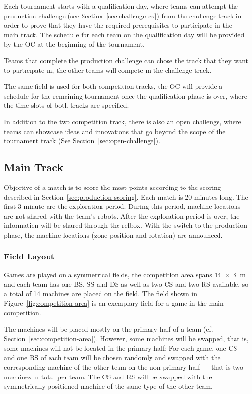 \documentclass[12pt,twoside]{article}
\newcommand{\refsec}[1]{Section~\ref{#1}}
\newcommand{\reffig}[1]{Figure~\ref{#1}}
\begin{document}
Each tournament starts with a qualification day, where teams can attempt
the production challenge (see \refsec{sec:challenge-cx}) from the challenge
track in order to prove that they have the required prerequisites to participate
in the main track. The schedule for each team on the qualification day will be
provided by the \ac{OC} at the beginning of the tournament.

Teams that complete the production challenge can chose the track that they
want to participate in, the other teams will compete in the challenge track.

The same field is used for both competition tracks, the \ac{OC} will provide
a schedule for the remaining tournament once the qualification phase is over,
where the time slots of both tracks are specified.

In addition to the two competition track, there is also an open challenge, where
teams can showcase ideas and innovations that go beyond the scope of the
tournament track (See \refsec{sec:open-challenge}).

\subsection{Main Track}
\label{sec:tournament-main}
Objective of a match is to score the most points according to the scoring
described in \refsec{sec:production-scoring}.
Each match is 20 minutes long. The first 3 minute are the exploration period.
During this period, machine locations are not shared with the team's robots.
After the exploration period is over, the information will be shared through
the \ac{refbox}.
With the switch to the production phase, the machine locations (zone position
and rotation) are announced.

\subsubsection{Field Layout}
Games are played on a symmetrical fields, the competition area spans
\SI{14 x 8}{\metre} and each team has one \ac{BS}, \ac{SS} %
and \ac{DS} as well as  two \ac{CS} and two \ac{RS} available,
so a total of 14 machines are placed on the field.
The field shown in \reffig{fig:competition-area} is an exemplary field for
a game in the main competition.

The machines will be placed mostly on the primary half
of a team (cf. \refsec{sec:competition-area}). However, some machines will be
swapped, that is, some machines will not be located in the primary
half:
For each game, one \ac{CS} and one \ac{RS} of each team will be chosen randomly
and swapped with the corresponding machine of the other team on the
non-primary half --- that is two machines in total per team. The \ac{CS} and
\ac{RS} will be swapped with the symmetrically positioned machine of the
same type of the other team.
\end{document}
